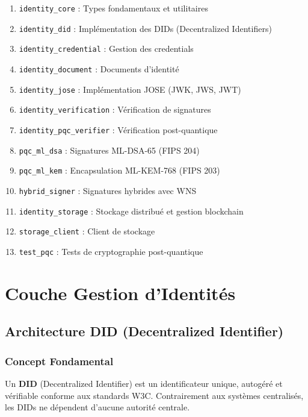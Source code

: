 \documentclass[12pt,a4paper]{report}
\begin{document}
\begin{enumerate}
  \item \texttt{identity\_core} : Types fondamentaux et utilitaires
  \item \texttt{identity\_did} : Implémentation des DIDs (Decentralized Identifiers)
  \item \texttt{identity\_credential} : Gestion des credentials
  \item \texttt{identity\_document} : Documents d'identité
  \item \texttt{identity\_jose} : Implémentation JOSE (JWK, JWS, JWT)
  \item \texttt{identity\_verification} : Vérification de signatures
  \item \texttt{identity\_pqc\_verifier} : Vérification post-quantique
  \item \texttt{pqc\_ml\_dsa} : Signatures ML-DSA-65 (FIPS 204)
  \item \texttt{pqc\_ml\_kem} : Encapsulation ML-KEM-768 (FIPS 203)
  \item \texttt{hybrid\_signer} : Signatures hybrides avec WNS
  \item \texttt{identity\_storage} : Stockage distribué et gestion blockchain
  \item \texttt{storage\_client} : Client de stockage
  \item \texttt{test\_pqc} : Tests de cryptographie post-quantique
\end{enumerate}

\chapter{Couche Gestion d'Identités}

\section{Architecture DID (Decentralized Identifier)}

\subsection{Concept Fondamental}

Un \textbf{DID} (Decentralized Identifier) est un identificateur unique, autogéré et vérifiable conforme aux standards W3C. Contrairement aux systèmes centralisés, les DIDs ne dépendent d'aucune autorité centrale.
\end{document}

